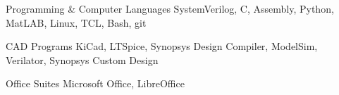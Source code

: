 

\begin{cvhonors}

  \cvhonor
    {Programming \& Computer Languages} %
    {SystemVerilog, C, Assembly, Python, MatLAB,  Linux, TCL, Bash, git} %
    {}
    {}


  \cvhonor
    {CAD Programs} %
    {KiCad, LTSpice, Synopsys Design Compiler, ModelSim, Verilator, Synopsys Custom Design} %
    {}
    {}


  \cvhonor
    {Office Suites} %
    {Microsoft Office, LibreOffice} %
    {}
    {}

\end{cvhonors}
